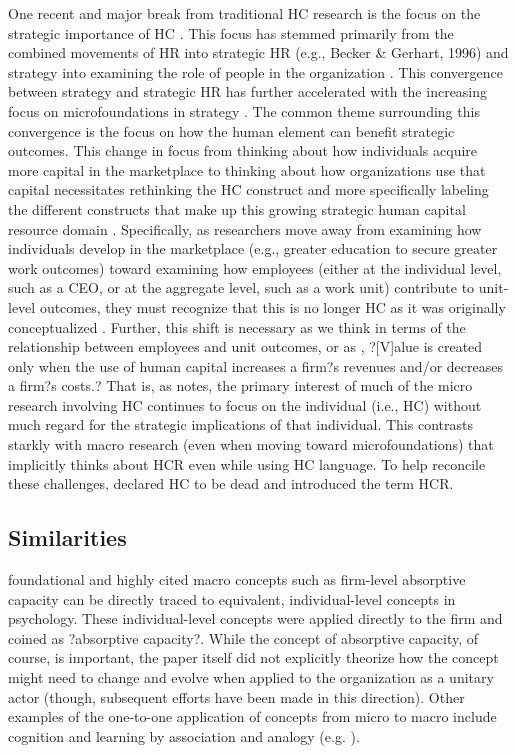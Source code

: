 \documentclass[12pt,letterpaper]{article}
\begin{document}
One recent and major break from traditional HC research is the focus on the strategic importance of HC \citep{Wright2014}. This focus has stemmed primarily from the combined movements of HR into strategic HR (e.g., Becker \& Gerhart, 1996)
and strategy into examining the role of people in the organization \citep{Hitt2001b}. This convergence between strategy and strategic HR has further accelerated with the increasing focus on microfoundations in strategy \citep{Nyberg2014}. The common theme surrounding this convergence is the focus on how the human element can benefit strategic outcomes.
This change in focus from thinking about how individuals acquire more capital in the marketplace to thinking about how organizations use that capital necessitates rethinking the HC construct and more specifically labeling the different constructs that make up this growing strategic human capital resource domain \citep{Wright2014}. Specifically, as researchers move away from examining how individuals
develop in the marketplace (e.g., greater education to secure greater work outcomes) toward examining how employees (either at the individual level, such as a CEO, or at the aggregate level, such as a work unit) contribute to unit-level outcomes, they must recognize that this is no longer HC as it was originally conceptualized \citep{Ployhart2014}. Further, this shift is necessary as we think in
terms of the relationship between employees and unit outcomes, or as \cite{Molloy2015}, ?[V]alue is created only when the use of human capital increases a firm?s revenues and/or decreases a firm?s costs.? That is, as \cite{Ployhart2015} notes, the primary
interest of much of the micro research involving HC continues to focus on the individual (i.e., HC) without much regard for the strategic implications of that individual. This contrasts starkly with macro research (even when moving toward microfoundations) that implicitly thinks about HCR even while using HC language. To help reconcile these challenges, \cite{Ployhart2014} declared HC to be dead and introduced the term HCR.

\subsection{Similarities}
foundational and highly cited macro concepts such as firm-level absorptive capacity \citep{Cohen1990} can be directly traced to equivalent, individual-level concepts in psychology.  These individual-level concepts were applied directly to the firm and coined as ?absorptive capacity?. While the concept of absorptive capacity, of course, is important, the paper itself did not explicitly theorize how the concept might need to change and evolve when applied to the organization as a unitary actor (though, subsequent efforts have been made in this direction). Other examples of the one-to-one application of concepts from micro to macro include cognition and learning by association and analogy (e.g. \cite{Gavetti2012b, Gavetti2005b}).
\end{document}
